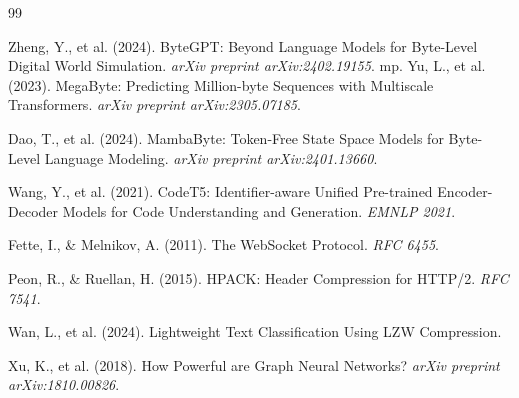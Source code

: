 \documentclass[12pt,a4paper]{article}
\begin{document}

\begin{thebibliography}{99}

Zheng, Y., et al. (2024). ByteGPT: Beyond Language Models for Byte-Level Digital World Simulation. \textit{arXiv preprint arXiv:2402.19155}.
mp.
Yu, L., et al. (2023). MegaByte: Predicting Million-byte Sequences with Multiscale Transformers. \textit{arXiv preprint arXiv:2305.07185}.

Dao, T., et al. (2024). MambaByte: Token-Free State Space Models for Byte-Level Language Modeling. \textit{arXiv preprint arXiv:2401.13660}.

Wang, Y., et al. (2021). CodeT5: Identifier-aware Unified Pre-trained Encoder-Decoder Models for Code Understanding and Generation. \textit{EMNLP 2021}.

Fette, I., \& Melnikov, A. (2011). The WebSocket Protocol. \textit{RFC 6455}.

Peon, R., \& Ruellan, H. (2015). HPACK: Header Compression for HTTP/2. \textit{RFC 7541}.

Wan, L., et al. (2024). Lightweight Text Classification Using LZW Compression.

Xu, K., et al. (2018). How Powerful are Graph Neural Networks? \textit{arXiv preprint arXiv:1810.00826}.

\end{thebibliography}
\end{document}
